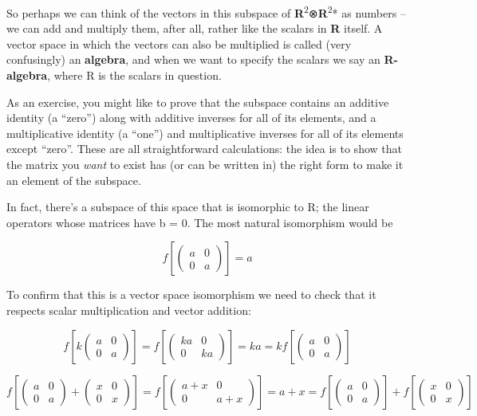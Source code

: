 \documentclass[oneside,english]{amsbook}
\numberwithin{section}{chapter}
\theoremstyle{plain}
\theoremstyle{definition}
\begin{document}
So perhaps we can think of the vectors in this subspace of
\textbf{R}\textsuperscript{2}⊗\textbf{R}\textsuperscript{2}* as numbers
-- we can add and multiply them, after all, rather like the scalars in
\textbf{R} itself. A vector space in which the vectors can also be
multiplied is called (very confusingly) an \textbf{algebra}, and when we
want to specify the scalars we say an \textbf{R-algebra}, where R is the
scalars in question.

As an exercise, you might like to prove that the subspace contains an
additive identity (a ``zero'') along with additive inverses for all of
its elements, and a multiplicative identity (a ``one'') and
multiplicative inverses for all of its elements except ``zero''. These
are all straightforward calculations: the idea is to show that the
matrix you \emph{want} to exist has (or can be written in) the right
form to make it an element of the subspace.

In fact, there's a subspace of this space that is isomorphic to R; the
linear operators whose matrices have b = 0. The most natural isomorphism
would be

\[f\left\lbrack \begin{pmatrix}
	a & 0 \\
	0 & a
\end{pmatrix} \right\rbrack = a\]

To confirm that this is a vector space isomorphism we need to check that
it respects scalar multiplication and vector addition:

\[f\left\lbrack k\begin{pmatrix}
	a & 0 \\
	0 & a
\end{pmatrix} \right\rbrack = f\left\lbrack \begin{pmatrix}
	ka & 0 \\
	0 & ka
\end{pmatrix} \right\rbrack = ka = kf\left\lbrack \begin{pmatrix}
	a & 0 \\
	0 & a
\end{pmatrix} \right\rbrack\]

\[f\left\lbrack \begin{pmatrix}
	a & 0 \\
	0 & a
\end{pmatrix} + \begin{pmatrix}
	x & 0 \\
	0 & x
\end{pmatrix} \right\rbrack = f\left\lbrack \begin{pmatrix}
	a + x & 0 \\
	0 & a + x
\end{pmatrix} \right\rbrack = a + x = f\left\lbrack \begin{pmatrix}
	a & 0 \\
	0 & a
\end{pmatrix} \right\rbrack + f\left\lbrack \begin{pmatrix}
	x & 0 \\
	0 & x
\end{pmatrix} \right\rbrack\]
\end{document}
